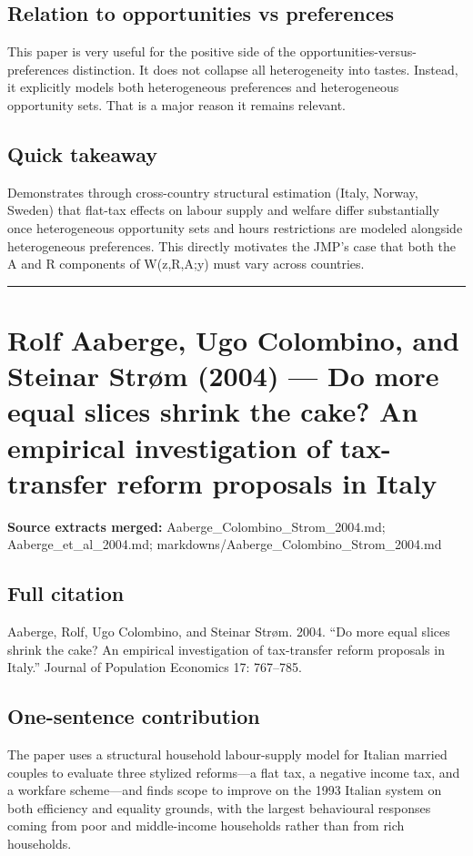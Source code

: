 \documentclass[11pt,a4paper]{article}
\begin{document}
\subsection*{Relation to opportunities vs preferences}
This paper is very useful for the positive side of the opportunities-versus-preferences distinction. It does not collapse all heterogeneity into tastes. Instead, it explicitly models both heterogeneous preferences and heterogeneous opportunity sets. That is a major reason it remains relevant.

\subsection*{Quick takeaway}
Demonstrates through cross-country structural estimation (Italy, Norway, Sweden) that flat-tax effects on labour supply and welfare differ substantially once heterogeneous opportunity sets and hours restrictions are modeled alongside heterogeneous preferences. This directly motivates the JMP's case that both the A and R components of W(z,R,A;y) must vary across countries.


\medskip\hrule\medskip

\section*{Rolf Aaberge, Ugo Colombino, and Steinar Strøm (2004) — Do more equal slices shrink the cake? An empirical investigation of tax-transfer reform proposals in Italy}

\textbf{Source extracts merged:} Aaberge\_Colombino\_Strom\_2004.md; Aaberge\_et\_al\_2004.md; markdowns/Aaberge\_Colombino\_Strom\_2004.md

\subsection*{Full citation}
Aaberge, Rolf, Ugo Colombino, and Steinar Strøm. 2004. “Do more equal slices shrink the cake? An empirical investigation of tax-transfer reform proposals in Italy.” Journal of Population Economics 17: 767–785.

\subsection*{One-sentence contribution}
The paper uses a structural household labour-supply model for Italian married couples to evaluate three stylized reforms—a flat tax, a negative income tax, and a workfare scheme—and finds scope to improve on the 1993 Italian system on both efficiency and equality grounds, with the largest behavioural responses coming from poor and middle-income households rather than from rich households.
\end{document}

